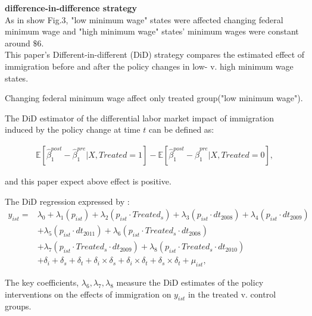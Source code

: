 \documentclass[../root]{subfiles}
\begin{document}
    {\bf difference-in-difference strategy} \\
    As in show Fig.3, "low minimum wage" states were affected changing federal minimum wage and "high minimum wage" states' minimum wages were constant around $\$$6. \\
    This paper's Different-in-different (DiD) strategy compares the estimated effect of immigration before and after the policy changes in low- v. high minimum wage states.

    Changing federal minimum wage affect only treated group("low minimum wage").

    The DiD estimator of the differential labor market impact of immigration induced by the policy change at time $t$ can be defined as:

    \begin{align}
        \mathbb{E}[\hat{\beta}^{post}_1 - \hat{\beta}^{pre}_1|X, Treated =1] -\mathbb{E}[\hat{\beta}^{post}_1 - \hat{\beta}^{pre}_1|X, Treated =0], 
    \end{align}

    and this paper expect above effect is positive. 

    The DiD regression expressed by :
    \begin{align}
        y_{ist}=&\lambda_0+\lambda_1(p_{ist})+\lambda_2(p_{ist} \cdot Treated_s)+\lambda_3(p_{ist} \cdot dt_{2008})+\lambda_4(p_{ist} \cdot dt_{2009}) \\ \nonumber
        &+\lambda_5(p_{ist} \cdot dt_{2011})+\lambda_6(p_{ist} \cdot Treated_s \cdot dt_{2008}) \\ \nonumber
        &+\lambda_7(p_{ist} \cdot Treated_s \cdot dt_{2009})+\lambda_8(p_{ist} \cdot Treated_s \cdot dt_{2010}) \\ \nonumber
        &+\delta_i + \delta_s + \delta_t + \delta_i \times \delta_s +\delta_i \times \delta_t +\delta_s \times \delta_t +\mu_{ist}, 
    \end{align}


    The key coefficients, $\lambda_6, \lambda_7, \lambda_8$ measure the DiD estimates of the policy interventions on the effects of immigration on $y_{ist}$ in the treated v. control groups.
\end{document}
